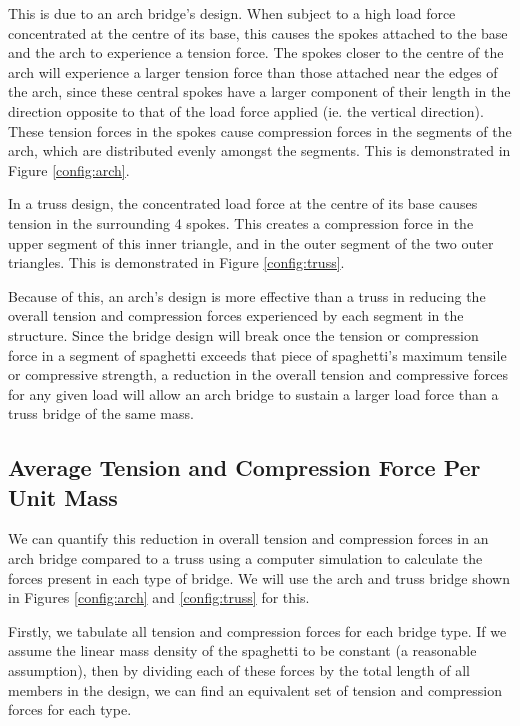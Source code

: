 \documentclass[a4paper,11pt]{article}
\begin{document}
This is due to an arch bridge's design.
When subject to a high load force concentrated at the centre of its base, this
causes the spokes attached to the base and the arch to experience a tension
force.
The spokes closer to the centre of the arch will experience a larger tension
force than those attached near the edges of the arch, since these central spokes
have a larger component of their length in the direction opposite to that of the
load force applied (ie. the vertical direction).
These tension forces in the spokes cause compression forces in the segments of
the arch, which are distributed evenly amongst the segments.
This is demonstrated in Figure \ref{config:arch}.

In a truss design, the concentrated load force at the centre of its base causes
tension in the surrounding 4 spokes.
This creates a compression force in the upper segment of this inner triangle,
and in the outer segment of the two outer triangles.
This is demonstrated in Figure \ref{config:truss}.

Because of this, an arch's design is more effective than a truss in reducing
the overall tension and compression forces experienced by each segment in the
structure.
Since the bridge design will break once the tension or compression force in a
segment of spaghetti exceeds that piece of spaghetti's maximum tensile or
compressive strength, a reduction in the overall tension and compressive forces
for any given load will allow an arch bridge to sustain a larger load force
than a truss bridge of the same mass.


\subsection{Average Tension and Compression Force Per Unit Mass}

We can quantify this reduction in overall tension and compression forces in an
arch bridge compared to a truss using a computer simulation to calculate the
forces present in each type of bridge.
We will use the arch and truss bridge shown in Figures \ref{config:arch} and
\ref{config:truss} for this.

Firstly, we tabulate all tension and compression forces for each bridge type.
If we assume the linear mass density of the spaghetti to be constant (a
reasonable assumption), then by dividing each of these forces by the total
length of all members in the design, we can find an equivalent set of tension
and compression forces for each type.
\end{document}
